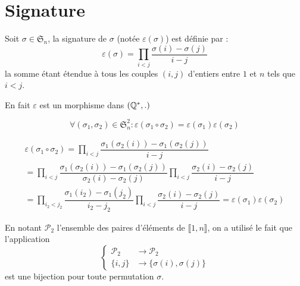 \section{Signature}
\begin{defi}
 Soit $\sigma\in \mathfrak S_n$, la signature de $\sigma$ (notée $\varepsilon(\sigma)$) est définie par :
\begin{displaymath}
 \varepsilon(\sigma) = \prod_{i<j}\dfrac{\sigma(i)-\sigma(j)}{i-j}
\end{displaymath}
la somme étant étendue à tous les couples $(i,j)$ d'entiers entre $1$ et $n$ tels que $i<j$.
\end{defi}
En fait $\varepsilon$ est un morphisme dans $(\mathbb{Q}^*, .)$
\begin{propn}
 \begin{displaymath}
  \forall (\sigma_1,\sigma_2)\in \mathfrak S_n ^2 : \varepsilon(\sigma_1 \circ \sigma_2)
= \varepsilon(\sigma_1) \varepsilon(\sigma_2)
 \end{displaymath}
\end{propn}
\begin{demo}
 \begin{multline*}
  \varepsilon(\sigma_1 \circ \sigma_2)
= \prod_{i<j}\dfrac{\sigma_1(\sigma_2(i))-\sigma_1(\sigma_2(j))}{i-j}\\
= \prod_{i<j}\dfrac{\sigma_1(\sigma_2(i))-\sigma_1(\sigma_2(j))}{\sigma_2(i)-\sigma_2(j)}
  \prod_{i<j}\dfrac{\sigma_2(i)-\sigma_2(j)}{i-j}\\
=  \prod_{i_2<j_2}\dfrac{\sigma_1(i_2)-\sigma_1(j_2)}{i_2-j_2}
  \prod_{i<j}\dfrac{\sigma_2(i)-\sigma_2(j)}{i-j} 
= \varepsilon(\sigma_1)\varepsilon(\sigma_2)
 \end{multline*}
\end{demo}
En notant $\mathcal P_2$ l'ensemble des paires d'éléments de $\llbracket 1,n \rrbracket$, on a utilisé le fait que l'application
\begin{displaymath}
 \left\lbrace 
\begin{aligned}
 \mathcal P_2 &\rightarrow \mathcal P_2 \\
 \{i,j\} &\rightarrow \{\sigma(i),\sigma(j)\}
\end{aligned}
\right. 
\end{displaymath}
est une bijection pour toute permutation $\sigma$.
\clearpage

